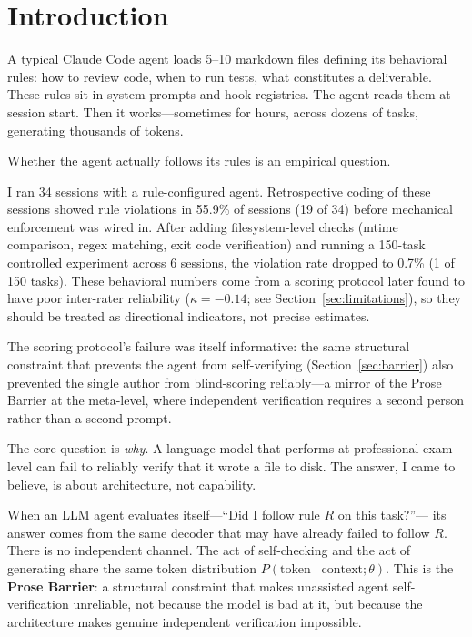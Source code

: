 \documentclass[11pt]{article}
\begin{document}
\section{Introduction}

A typical Claude Code agent loads 5--10 markdown files defining its behavioral
rules: how to review code, when to run tests, what constitutes a deliverable.
These rules sit in system prompts and hook registries. The agent reads them at
session start. Then it works---sometimes for hours, across dozens of tasks,
generating thousands of tokens.

Whether the agent actually follows its rules is an empirical question.

I ran 34 sessions with a rule-configured agent. Retrospective coding of these
sessions showed rule violations in 55.9\% of sessions (19 of 34) before
mechanical enforcement was wired in. After adding filesystem-level checks
(mtime comparison, regex matching, exit code verification) and running a
150-task controlled experiment across 6 sessions, the violation rate dropped to
0.7\% (1 of 150 tasks). These behavioral numbers come from a scoring protocol
later found to have poor inter-rater reliability ($\kappa=-0.14$; see
Section~\ref{sec:limitations}), so they should be treated as directional
indicators, not precise estimates.

The scoring protocol's failure was itself informative: the same structural
constraint that prevents the agent from self-verifying (Section~\ref{sec:barrier})
also prevented the single author from blind-scoring reliably---a mirror of the
Prose Barrier at the meta-level, where independent verification requires a second
person rather than a second prompt.

The core question is \textit{why}. A language model that performs at
professional-exam level can fail to reliably verify that it wrote a file to disk.
The answer, I came to believe, is about architecture, not capability.

When an LLM agent evaluates itself---``Did I follow rule $R$ on this task?''---
its answer comes from the same decoder that may have already failed to follow
$R$. There is no independent channel. The act of self-checking and the act of
generating share the same token distribution
$P(\text{token} \mid \text{context}; \theta)$. This is the
\textbf{Prose Barrier}: a structural constraint that makes unassisted agent
self-verification unreliable, not because the model is bad at it, but because
the architecture makes genuine independent verification impossible.
\end{document}
